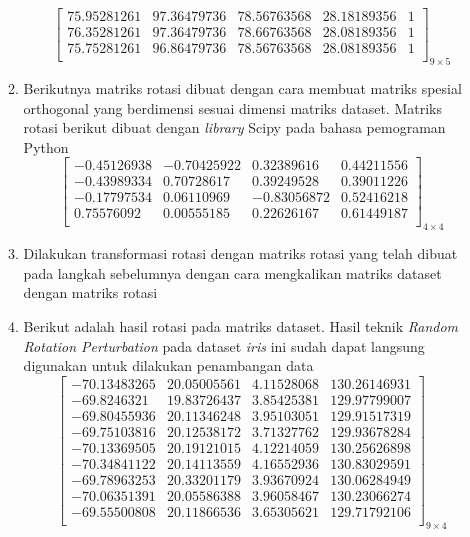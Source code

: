 \documentclass[a4paper,twoside]{article}
\begin{document}
\begin{enumerate}
\begin{enumerate}
\[\begin{bmatrix}
					75.95281261  & 97.36479736 &  78.56763568 &  28.18189356 & 1 \\
					76.35281261  & 97.36479736 &  78.66763568 &  28.08189356 & 1 \\
					75.75281261  & 96.86479736 &  78.56763568 &  28.08189356 & 1 \\
				\end{bmatrix}_{9\times 5}
			\]
			\item Berikutnya matriks rotasi dibuat dengan cara membuat matriks spesial orthogonal yang berdimensi sesuai dimensi matriks dataset. Matriks rotasi berikut dibuat dengan \textit{library} Scipy pada bahasa pemograman Python
			\[
				\begin{bmatrix}
					-0.45126938		&		-0.70425922		&		 0.32389616		&		0.44211556 \\
					-0.43989334		&		 0.70728617		&		 0.39249528		&		0.39011226 \\
					-0.17797534		&		 0.06110969		&		-0.83056872		&		0.52416218 \\
					 0.75576092		&		 0.00555185		&		 0.22626167		&		0.61449187 \\
				\end{bmatrix}_{4\times 4}
			\]
			\item Dilakukan transformasi rotasi dengan matriks rotasi yang telah dibuat pada langkah sebelumnya dengan cara mengkalikan matriks dataset dengan matriks rotasi
			\item Berikut adalah hasil rotasi pada matriks dataset. Hasil teknik \textit{Random Rotation Perturbation} pada dataset \textit{iris} ini sudah dapat langsung digunakan untuk dilakukan penambangan data
			\[
				\begin{bmatrix}
				-70.13483265  &  20.05005561  &   4.11528068  & 130.26146931 \\
				-69.8246321   &  19.83726437  &   3.85425381 &  129.97799007 \\
				-69.80455936  &  20.11346248  &   3.95103051 &  129.91517319 \\
				-69.75103816  &  20.12538172  &   3.71327762 &  129.93678284 \\
				-70.13369505  &  20.19121015  &   4.12214059 &  130.25626898 \\
				-70.34841122  &  20.14113559  &   4.16552936  & 130.83029591 \\
				-69.78963253 &   20.33201179  &   3.93670924 &  130.06284949 \\
				-70.06351391 &   20.05586388   &  3.96058467 &  130.23066274 \\
				-69.55500808  &  20.11866536  &   3.65305621  & 129.71792106 \\
				\end{bmatrix}_{9\times 4}
			\]
		\end{enumerate} 


\end{enumerate}
\end{document}
